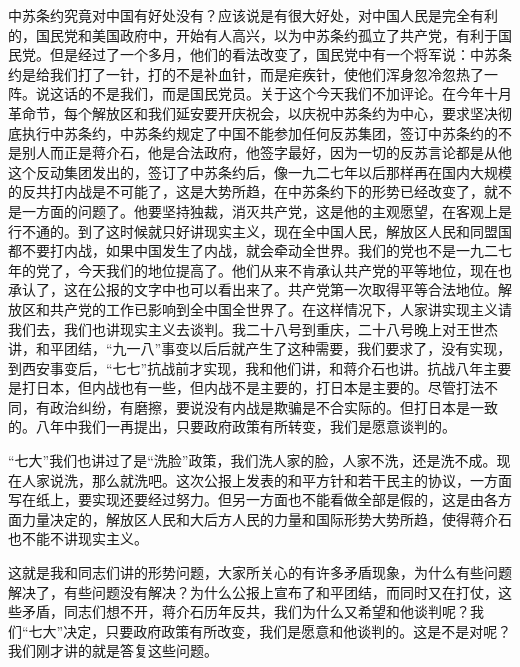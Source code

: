 中苏条约究竟对中国有好处没有？应该说是有很大好处，对中国人民是完全有利的，国民党和美国政府中，开始有人高兴，以为中苏条约孤立了共产党，有利于国民党。但是经过了一个多月，他们的看法改变了，国民党中有一个将军说：中苏条约是给我们打了一针，打的不是补血针，而是疟疾针，使他们浑身忽冷忽热了一阵。说这话的不是我们，而是国民党员。关于这个今天我们不加评论。在今年十月革命节，每个解放区和我们延安要开庆祝会，以庆祝中苏条约为中心，要求坚决彻底执行中苏条约，中苏条约规定了中国不能参加任何反苏集团，签订中苏条约的不是别人而正是蒋介石，他是合法政府，他签字最好，因为一切的反苏言论都是从他这个反动集团发出的，签订了中苏条约后，像一九二七年以后那样再在国内大规模的反共打内战是不可能了，这是大势所趋，在中苏条约下的形势已经改变了，就不是一方面的问题了。他要坚持独裁，消灭共产党，这是他的主观愿望，在客观上是行不通的。到了这时候就只好讲现实主义，现在全中国人民，解放区人民和同盟国都不要打内战，如果中国发生了内战，就会牵动全世界。我们的党也不是一九二七年的党了，今天我们的地位提高了。他们从来不肯承认共产党的平等地位，现在也承认了，这在公报的文字中也可以看出来了。共产党第一次取得平等合法地位。解放区和共产党的工作已影响到全中国全世界了。在这样情况下，人家讲实现主义请我们去，我们也讲现实主义去谈判。我二十八号到重庆，二十八号晚上对王世杰讲，和平团结，“九一八”事变以后后就产生了这种需要，我们要求了，没有实现，到西安事变后，“七七”抗战前才实现，我和他们讲，和蒋介石也讲。抗战八年主要是打日本，但内战也有一些，但内战不是主要的，打日本是主要的。尽管打法不同，有政治纠纷，有磨擦，要说没有内战是欺骗是不合实际的。但打日本是一致的。八年中我们一再提出，只要政府政策有所转变，我们是愿意谈判的。

“七大”我们也讲过了是“洗脸”政策，我们洗人家的脸，人家不洗，还是洗不成。现在人家说洗，那么就洗吧。这次公报上发表的和平方针和若干民主的协议，一方面写在纸上，要实现还要经过努力。但另一方面也不能看做全部是假的，这是由各方面力量决定的，解放区人民和大后方人民的力量和国际形势大势所趋，使得蒋介石也不能不讲现实主义。

这就是我和同志们讲的形势问题，大家所关心的有许多矛盾现象，为什么有些问题解决了，有些问题没有解决？为什么公报上宣布了和平团结，而同时又在打仗，这些矛盾，同志们想不开，蒋介石历年反共，我们为什么又希望和他谈判呢？我们“七大”决定，只要政府政策有所改变，我们是愿意和他谈判的。这是不是对呢？我们刚才讲的就是答复这些问题。

